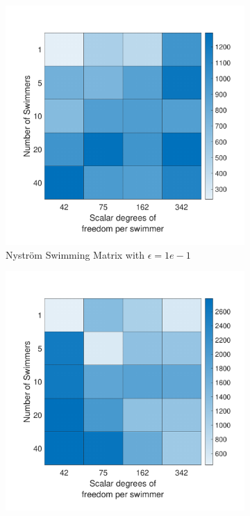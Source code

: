 \begin{figure}
\ContinuedFloat
    \begin{subfigure}{0.3\textwidth}
        \includegraphics[width=\linewidth]{Images/Condition/Mobility matrix-1.pdf}
        \caption{Nyström Swimming Matrix with $\epsilon=1e-1$}
    \end{subfigure}
    \begin{subfigure}{0.3\textwidth}
        \includegraphics[width=\linewidth]{Images/Condition/Mobility matrix-2.pdf}

\end{subfigure}
\end{figure}
